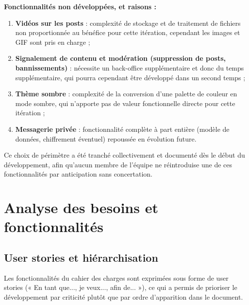 \documentclass{cesi}
\begin{document}
\begin{infobox}
\textbf{Fonctionnalités non développées, et raisons :}
\begin{enumerate}[label=\textbullet, leftmargin=1.4em, itemsep=4pt, topsep=6pt]
  \item \textbf{Vidéos sur les posts} : complexité de stockage et de traitement de
        fichiers non proportionnée au bénéfice pour cette itération,
        cependant les images et GIF sont pris en charge ;
  \item \textbf{Signalement de contenu et modération (suppression de posts, bannissements)} :
        nécessite un back-office supplémentaire et donc du temps supplémentaire,
        qui pourra cependant être développé dans un second temps ;
  \item \textbf{Thème sombre} : complexité de la conversion d'une palette de couleur en
        mode sombre, qui n'apporte pas de valeur fonctionnelle directe pour cette itération ;
  \item \textbf{Messagerie privée} : fonctionnalité complète à part entière
        (modèle de données, chiffrement éventuel) repoussée en évolution future.
\end{enumerate}
\end{infobox}

Ce choix de périmètre a été tranché collectivement et documenté dès le début du
développement, afin qu'aucun membre de l'équipe ne réintroduise une de ces
fonctionnalités par anticipation sans concertation.

\newpage
\section{Analyse des besoins et fonctionnalités}

\subsection{User stories et hiérarchisation}

Les fonctionnalités du cahier des charges sont exprimées sous forme de user stories
(« En tant que..., je veux..., afin de... »), ce qui a permis de prioriser le
développement par criticité plutôt que par ordre d'apparition dans le document.
\end{document}
